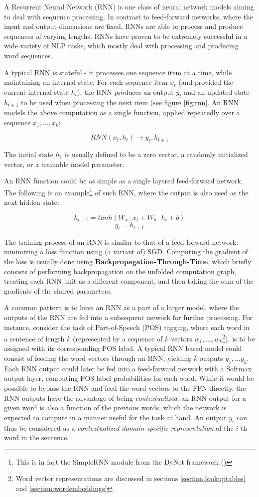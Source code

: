 A Recurrent Neural Network (RNN) is one class of neural network models aiming to deal with sequence processing. In contrast to feed-forward networks, where the input and output dimensions are fixed, RNNs are able to process and produce sequences of varying lengths. RNNs have proven to be extremely successful in a wide variety of NLP tasks, which mostly deal with processing and producing word sequences. 

A typical RNN is stateful - it processes one sequence item at a time, while maintaining an internal state. For each sequence item $x_t$ (and provided the current internal state $h_t$), the RNN produces an output $y_t$ and an updated state $h_{t+1}$ to be used when processing the next item (see figure \ref{fig:rnn}. An RNN models the above computation as a single function, applied repeatedly over a sequence $x_1, ... ,x_k$:

$$ RNN(x_t, h_t) \rightarrow y_t, h_{t+1} $$

The initial state $h_1$ is usually defined to be a zero vector, a randomly initialized vector, or a trainable model parameter. 

An RNN function could be as simple as a single layered feed-forward network. The following is an example\footnote{This is in fact the SimpleRNN module from the DyNet framework (\cite{dynet})} of such RNN, where the output is also used as the next hidden state:

$$h_{t+1} = tanh(W_x \cdot x_t + W_h \cdot h_t + b)$$
$$y_t = h_{t+1}$$

The training process of an RNN is similar to that of a feed forward network: minimizing a loss function using (a variant of) SGD. Computing the gradient of the loss is usually done using \textbf{Backpropagation-Through-Time}, which briefly consists of performing backpropagation on the unfolded computation graph, treating each RNN unit as a different component, and then taking the sum of the gradients of the shared parameters. 

A common pattern is to have an RNN as a part of a larger model, where the outputs of the RNN are fed into a subsequent network for further processing. For instance, consider the task of Part-of-Speech (POS) tagging, where each word in a sentence of length $k$ (represented by a sequence of $k$ vectors $w_1,...,w_k$\footnote{Word vector representations are discussed in sections \ref{section:lookuptables} and \ref{section:wordembeddings}}), is to be assigned with its corresponding POS label. A typical RNN based model could consist of feeding the word vectors through an RNN, yielding $k$ outputs $y_1,...y_k$. Each RNN output could later be fed into a feed-forward network with a Softmax output layer, computing POS label probabilities for each word. While it would be possible to bypass the RNN and feed the word vectors to the FFN directly, the RNN outputs have the advantage of being \emph{contextualized}: an RNN output for a given word is also a function of the previous words, which the network is expected to compute in a manner useful for the task at hand. An output $y_i$ can thus be considered as a \emph{contextualized domain-specific representation} of the $i$-th word in the sentence.

